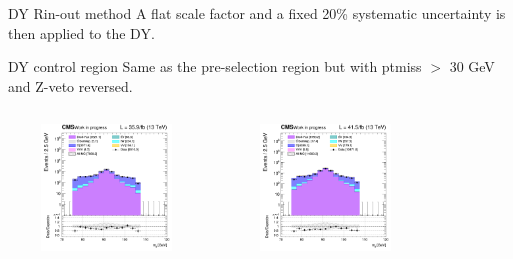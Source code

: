 \documentclass[8pt]{beamer}
\begin{document}
\begin{frame}{DY Rin-out method}
\vspace{-5pt}
A flat scale factor and a fixed 20\% systematic uncertainty is then applied to the DY. \vfill
\end{frame}

\begin{frame}{DY control region}
\justifying
Same as the pre-selection region but with ptmiss $>$ 30 GeV and Z-veto reversed.
\begin{columns}
		\begin{column}{0.33\textwidth}
			\begin{center}
			\vspace{-8pt}
			\begin{block}{}\end{block}\vspace{5pt}
     			\includegraphics[width=1.0\textwidth, height=95pt]{figs/2016/log_cratio_dyCR_ll_mllpeak.png}
    		\end{center}		
		\end{column} 
		\begin{column}{0.33\textwidth}
			\begin{center}
			\vspace{-8pt}
			\begin{block}{}\end{block}\vspace{5pt}
     			\includegraphics[width=1.0\textwidth, height=95pt]{figs/2017/log_cratio_dyCR_ll_mllpeak.png}
    		\end{center}		
		\end{column} 
		\begin{column}{0.33\textwidth}
			\begin{center}
			\vspace{-8pt}
			\begin{block}{}\end{block}\vspace{5pt}

\end{center}
\end{column}
\end{columns}
\end{frame}
\end{document}
